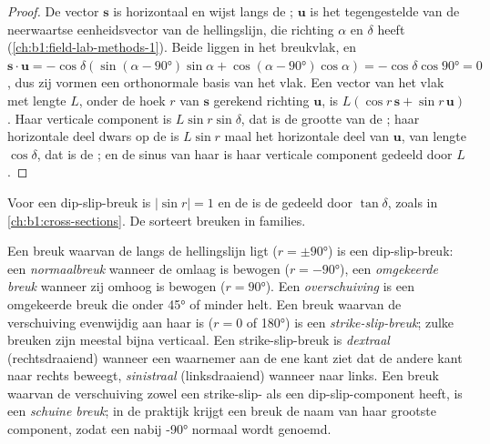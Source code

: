 \begin{proof}
De vector $\mathbf s$ is horizontaal en wijst langs de ; $\mathbf u$ is het tegengestelde van de neerwaartse eenheidsvector van de hellingslijn, die richting $\alpha$ en  $\delta$ heeft (\cref{ch:b1:field-lab-methods-1}). Beide liggen in het breukvlak, en $\mathbf s\cdot\mathbf u = -\cos\delta(\sin(\alpha -
\ang{90})\sin\alpha + \cos(\alpha - \ang{90})\cos\alpha) = -\cos\delta\cos\ang{90} = 0$, dus zij vormen een orthonormale basis van het vlak. Een vector van het vlak met lengte $L$, onder de hoek $r$ van $\mathbf s$ gerekend richting $\mathbf u$, is
$L(\cos r\,\mathbf s + \sin r\,\mathbf u)$. Haar verticale component is $L\sin r\sin\delta$, dat is de grootte van de ; haar horizontale deel dwars op de  is $L\sin r$ maal het horizontale deel van $\mathbf u$, van lengte $\cos\delta$, dat is de ; en de sinus van haar  is haar verticale component gedeeld door $L$.
\end{proof}

Voor een dip-slip-breuk is $|\sin r| = 1$ en de  is de  gedeeld door $\tan\delta$, zoals in \cref{ch:b1:cross-sections}. De  sorteert breuken in families.

\begin{definition}\label{def:b1:faults-folds-fabrics:fault-types}
Een breuk waarvan de  langs de hellingslijn ligt ($r = \pm\ang{90}$) is een dip-slip-breuk: een \emph{normaalbreuk} wanneer de  omlaag is bewogen ($r = \ang{-90}$), een \emph{omgekeerde breuk} wanneer zij omhoog is bewogen ($r = \ang{90}$). Een \emph{overschuiving} is een omgekeerde breuk die onder \ang{45} of minder helt. Een breuk waarvan de verschuiving evenwijdig aan haar  is ($r = 0$ of \ang{180}) is een \emph{strike-slip-breuk}; zulke breuken zijn meestal bijna verticaal. Een strike-slip-breuk is \emph{dextraal} (rechtsdraaiend) wanneer een waarnemer aan de ene kant ziet dat de andere kant naar rechts beweegt, \emph{sinistraal} (linksdraaiend) wanneer naar links. Een breuk waarvan de verschuiving zowel een strike-slip- als een dip-slip-component heeft, is een \emph{schuine breuk}; in de praktijk krijgt een breuk de naam van haar grootste component, zodat een  nabij \ang{-90} normaal wordt genoemd.
\end{definition}

